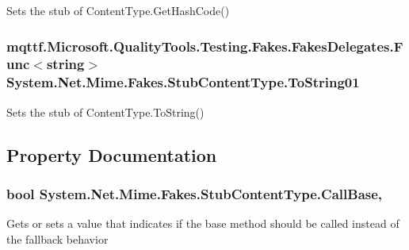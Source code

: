 Sets the stub of Content\-Type.\-Get\-Hash\-Code()

\hypertarget{class_system_1_1_net_1_1_mime_1_1_fakes_1_1_stub_content_type_ab5a7976ae9d9ce982912fd19274d5c6d}{
\subsubsection[{To\-String01}]{\setlength{\rightskip}{0pt plus 5cm}mqttf.\-Microsoft.\-Quality\-Tools.\-Testing.\-Fakes.\-Fakes\-Delegates.\-Func$<$string$>$ System.\-Net.\-Mime.\-Fakes.\-Stub\-Content\-Type.\-To\-String01}}\label{class_system_1_1_net_1_1_mime_1_1_fakes_1_1_stub_content_type_ab5a7976ae9d9ce982912fd19274d5c6d}


Sets the stub of Content\-Type.\-To\-String()



\subsection{Property Documentation}
\hypertarget{class_system_1_1_net_1_1_mime_1_1_fakes_1_1_stub_content_type_ab66255ef61fc85df91ff4b904c3d7456}{
\subsubsection[{Call\-Base}]{\setlength{\rightskip}{0pt plus 5cm}bool System.\-Net.\-Mime.\-Fakes.\-Stub\-Content\-Type.\-Call\-Base\hspace{0.3cm}{\ttfamily [get]}, {\ttfamily [set]}}}\label{class_system_1_1_net_1_1_mime_1_1_fakes_1_1_stub_content_type_ab66255ef61fc85df91ff4b904c3d7456}


Gets or sets a value that indicates if the base method should be called instead of the fallback behavior

